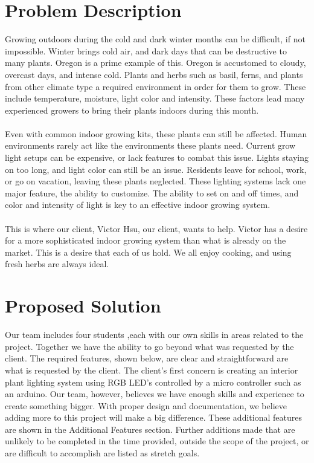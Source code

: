 \documentclass[onecolumn, draftclsnofoot,10pt, compsoc]{article}
\begin{document}
\newpage
{}
\tableofcontents
\clearpage

\section{Problem Description}
Growing outdoors during the cold and dark winter months can be difficult, if not impossible. Winter brings cold air, and dark days that can be destructive to many plants. Oregon is a prime example of this. Oregon is accustomed to cloudy, overcast days, and intense cold. Plants and herbs such as basil, ferns, and plants from other climate type a required environment in order for them to grow. These include temperature, moisture, light color and intensity. These factors lead many experienced growers to bring their plants indoors during this month.
\\
\\
Even with common indoor growing kits, these plants can still be affected. Human environments rarely act like the environments these plants need. Current grow light setups can be expensive, or lack features to combat this issue. Lights staying on too long, and light color can still be an issue. Residents leave for school, work, or go on vacation, leaving these plants neglected. These lighting systems lack one major feature, the ability to customize. The ability to set on and off times, and color and intensity of light is key to an effective indoor growing system.
\\
\\
This is where our client, Victor Hsu, our client, wants to help. Victor has a desire for a more sophisticated indoor growing system than what is already on the market. This is a desire that each of us hold. We all enjoy cooking, and using fresh herbs are always ideal. 

\section{Proposed Solution}
Our team includes four students ,each with our own skills in areas related to the project. Together we have the ability to go beyond what was requested by the client. The required features, shown below, are clear and straightforward are what is requested by the client. The client's first concern is creating an interior plant lighting system using RGB LED's controlled by a micro controller such as an arduino. Our team, however, believes we have enough skills and experience to create something bigger. With proper design and documentation, we believe adding more to this project will make a big difference. These additional features are shown in the Additional Features section. Further additions made that are unlikely to be completed in the time provided, outside the scope of the project, or are difficult to accomplish are listed as stretch goals.
\end{document}
